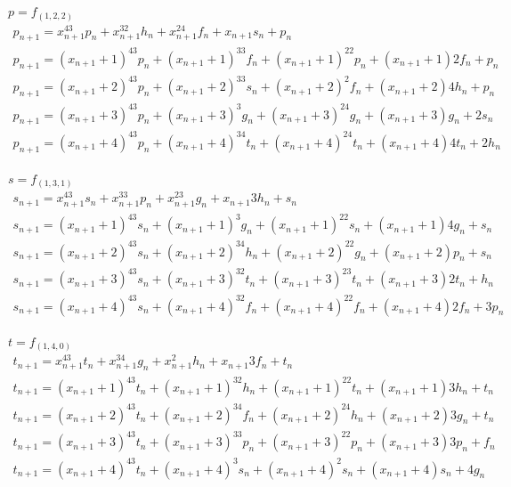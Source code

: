\documentclass[bibliography=totoc, a4paper, 14pt]{extarticle}
\begin{document}
$p=f_{(1,2,2)}$
$$
\begin{array}{l}
p_{n+1} = x_{n+1}^43p_{n} + x_{n+1}^32h_{n} + x_{n+1}^24f_{n} + x_{n+1}s_{n} + p_{n} \\
p_{n+1} = (x_{n+1}+1)^43p_{n} + (x_{n+1}+1)^33f_{n} + (x_{n+1}+1)^22p_{n} + (x_{n+1}+1)2f_{n} + p_{n} \\
p_{n+1} = (x_{n+1}+2)^43p_{n} + (x_{n+1}+2)^33s_{n} + (x_{n+1}+2)^2f_{n} + (x_{n+1}+2)4h_{n} + p_{n} \\
p_{n+1} = (x_{n+1}+3)^43p_{n} + (x_{n+1}+3)^3g_{n} + (x_{n+1}+3)^24g_{n} + (x_{n+1}+3)g_{n} + 2s_{n} \\
p_{n+1} = (x_{n+1}+4)^43p_{n} + (x_{n+1}+4)^34t_{n} + (x_{n+1}+4)^24t_{n} + (x_{n+1}+4)4t_{n} + 2h_{n} \\
\end{array}
$$

$s=f_{(1,3,1)}$
$$
\begin{array}{l}
s_{n+1} = x_{n+1}^43s_{n} + x_{n+1}^33p_{n} + x_{n+1}^23g_{n} + x_{n+1}3h_{n} + s_{n} \\
s_{n+1} = (x_{n+1}+1)^43s_{n} + (x_{n+1}+1)^3g_{n} + (x_{n+1}+1)^22s_{n} + (x_{n+1}+1)4g_{n} + s_{n} \\
s_{n+1} = (x_{n+1}+2)^43s_{n} + (x_{n+1}+2)^34h_{n} + (x_{n+1}+2)^22g_{n} + (x_{n+1}+2)p_{n} + s_{n} \\
s_{n+1} = (x_{n+1}+3)^43s_{n} + (x_{n+1}+3)^32t_{n} + (x_{n+1}+3)^23t_{n} + (x_{n+1}+3)2t_{n} + h_{n} \\
s_{n+1} = (x_{n+1}+4)^43s_{n} + (x_{n+1}+4)^32f_{n} + (x_{n+1}+4)^22f_{n} + (x_{n+1}+4)2f_{n} + 3p_{n} \\
\end{array}
$$

$t=f_{(1,4,0)}$
$$
\begin{array}{l}
t_{n+1} = x_{n+1}^43t_{n} + x_{n+1}^34g_{n} + x_{n+1}^2h_{n} + x_{n+1}3f_{n} + t_{n} \\
t_{n+1} = (x_{n+1}+1)^43t_{n} + (x_{n+1}+1)^32h_{n} + (x_{n+1}+1)^22t_{n} + (x_{n+1}+1)3h_{n} + t_{n} \\
t_{n+1} = (x_{n+1}+2)^43t_{n} + (x_{n+1}+2)^34f_{n} + (x_{n+1}+2)^24h_{n} + (x_{n+1}+2)3g_{n} + t_{n} \\
t_{n+1} = (x_{n+1}+3)^43t_{n} + (x_{n+1}+3)^33p_{n} + (x_{n+1}+3)^22p_{n} + (x_{n+1}+3)3p_{n} + f_{n} \\
t_{n+1} = (x_{n+1}+4)^43t_{n} + (x_{n+1}+4)^3s_{n} + (x_{n+1}+4)^2s_{n} + (x_{n+1}+4)s_{n} + 4g_{n} \\
\end{array}
$$
\end{document}
